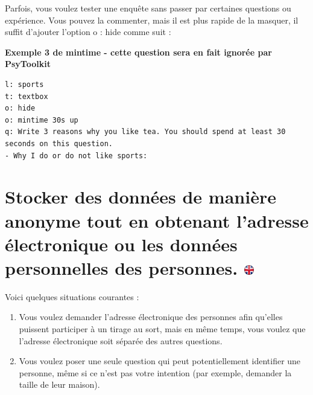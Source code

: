 \documentclass[
]{book}
\begin{document}
Parfois, vous voulez tester une enquête sans passer par certaines questions ou expérience. Vous pouvez la commenter, mais il est plus rapide de la masquer, il suffit d'ajouter l'option o : hide comme suit :

\textbf{Exemple 3 de mintime - cette question sera en fait ignorée par PsyToolkit}

\begin{verbatim}
l: sports
t: textbox
o: hide
o: mintime 30s up
q: Write 3 reasons why you like tea. You should spend at least 30 seconds on this question.
- Why I do or do not like sports:
\end{verbatim}

\hypertarget{stocker-des-donnuxe9es-de-maniuxe8re-anonyme-tout-en-obtenant-ladresse-uxe9lectronique-ou-les-donnuxe9es-personnelles-des-personnes.}{%
\section[Stocker des données de manière anonyme tout en obtenant l'adresse électronique ou les données personnelles des personnes. ]{\texorpdfstring{Stocker des données de manière anonyme tout en obtenant l'adresse électronique ou les données personnelles des personnes. \href{https://www.psytoolkit.org/doc3.4.0/online-survey-syntax.html\#_storing_data_anonymously_and_still_getting_peoples_email_or_personal_data}{\protect\includegraphics{img/ukflag.png}}}{Stocker des données de manière anonyme tout en obtenant l'adresse électronique ou les données personnelles des personnes. }}\label{stocker-des-donnuxe9es-de-maniuxe8re-anonyme-tout-en-obtenant-ladresse-uxe9lectronique-ou-les-donnuxe9es-personnelles-des-personnes.}}

Voici quelques situations courantes :

\begin{enumerate}
\def\labelenumi{\arabic{enumi}.}
\item
  Vous voulez demander l'adresse électronique des personnes afin qu'elles puissent participer à un tirage au sort, mais en même temps, vous voulez que l'adresse électronique soit séparée des autres questions.
\item
  Vous voulez poser une seule question qui peut potentiellement identifier une personne, même si ce n'est pas votre intention (par exemple, demander la taille de leur maison).
\end{enumerate}
\end{document}

